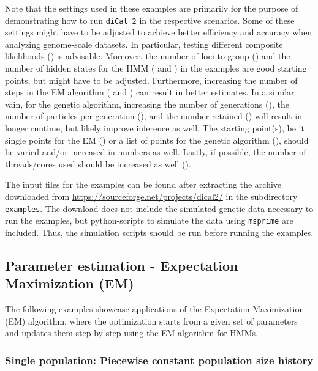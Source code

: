 \documentclass{article}
\numberwithin{equation}{section}
\begin{document}
Note that the settings used in these examples are primarily for the purpose of demonstrating how to run \texttt{diCal 2} in the respective scenarios. Some of these settings might have to be adjusted to achieve better efficiency and accuracy when analyzing genome-scale datasets. In particular, testing different composite likelihoods () is advisable. Moreover, the number of loci to group () and the number of hidden states for the HMM ( and ) in the examples are good starting points, but might have to be adjusted. Furthermore, increasing the number of steps in the EM algorithm ( and ) can result in better estimates. In a similar vain, for the genetic algorithm, increasing the number of generations (), the number of particles per generation (), and the number retained () will result in longer runtime, but likely improve inference as well. The starting point(s), be it single points for the EM () or a list of points for the genetic algorithm (), should be varied and/or increased in numbers as well. Lastly, if possible, the number of threads/cores used should be increased as well ().

The input files for the examples can be found after extracting the archive downloaded from \url{https://sourceforge.net/projects/dical2/} in the subdirectory \texttt{examples}. The download does not include the simulated genetic data necessary to run the examples, but python-scripts to simulate the data using \texttt{msprime} are included. Thus, the simulation scripts should be run before running the examples.


\subsection{Parameter estimation - Expectation Maximization (EM)}
\label{sec_examples_em}

The following examples showcase applications of the Expectation-Maximization (EM) algorithm, where the optimization starts from a given set of parameters and updates them step-by-step using the EM algorithm for HMMs.

\subsubsection{Single population: Piecewise constant population size history} 
\label{sec_examples_piecewise_constant}
\end{document}
